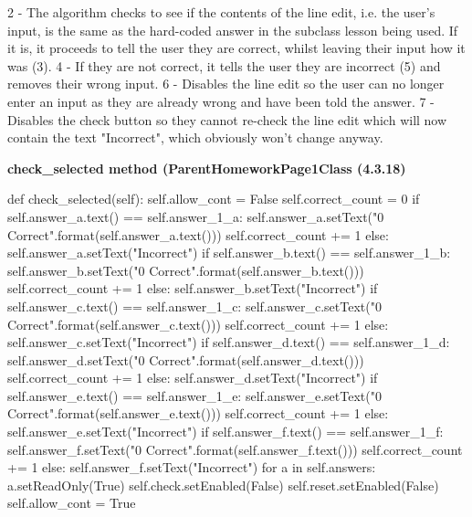 2 - The algorithm checks to see if the contents of the line edit, i.e. the user's input, is the same as the hard-coded answer in the subclass lesson being used. If it is, it proceeds to tell the user they are correct, whilst leaving their input how it was (3).
4 - If they are not correct, it tells the user they are incorrect (5) and removes their wrong input.
6 - Disables the line edit so the user can no longer enter an input as they are already wrong and have been told the answer.
7 - Disables the check button so they cannot re-check the line edit which will now contain the text "Incorrect", which obviously won't change anyway.

\textbf{check\_selected method (ParentHomeworkPage1Class (4.3.18)}

\begin{python}
def check_selected(self):
        self.allow_cont = False
        self.correct_count = 0
        if self.answer_a.text() == self.answer_1_a:
            self.answer_a.setText("{0} Correct".format(self.answer_a.text()))
            self.correct_count += 1
        else:
            self.answer_a.setText("Incorrect")
        if self.answer_b.text() == self.answer_1_b:
            self.answer_b.setText("{0} Correct".format(self.answer_b.text()))
            self.correct_count += 1
        else:
            self.answer_b.setText("Incorrect")
        if self.answer_c.text() == self.answer_1_c:
            self.answer_c.setText("{0} Correct".format(self.answer_c.text()))
            self.correct_count += 1
        else:
            self.answer_c.setText("Incorrect")
        if self.answer_d.text() == self.answer_1_d:
            self.answer_d.setText("{0} Correct".format(self.answer_d.text()))
            self.correct_count += 1
        else:
            self.answer_d.setText("Incorrect")
        if self.answer_e.text() == self.answer_1_e:
            self.answer_e.setText("{0} Correct".format(self.answer_e.text()))
            self.correct_count += 1
        else:
            self.answer_e.setText("Incorrect")
        if self.answer_f.text() == self.answer_1_f:
            self.answer_f.setText("{0} Correct".format(self.answer_f.text()))
            self.correct_count += 1
        else:
            self.answer_f.setText("Incorrect")
        for a in self.answers:
            a.setReadOnly(True)
        self.check.setEnabled(False)
        self.reset.setEnabled(False)
        self.allow_cont = True
\end{python}

